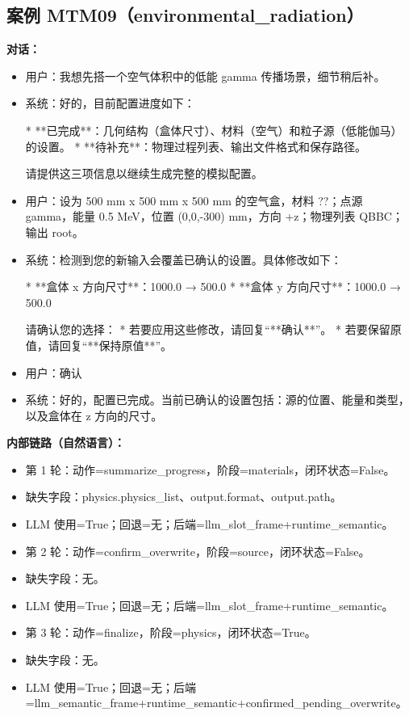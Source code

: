 \documentclass[11pt]{ctexart}
\begin{document}
\subsection{案例 MTM09（environmental\_radiation）}
\textbf{对话：}
\begin{itemize}
\item 用户：我想先搭一个空气体积中的低能 gamma 传播场景，细节稍后补。
\item 系统：好的，目前配置进度如下：

*   **已完成**：几何结构（盒体尺寸）、材料（空气）和粒子源（低能伽马）的设置。
*   **待补充**：物理过程列表、输出文件格式和保存路径。

请提供这三项信息以继续生成完整的模拟配置。
\item 用户：设为 500 mm x 500 mm x 500 mm 的空气盒，材料 ??；点源 gamma，能量 0.5 MeV，位置 (0,0,-300) mm，方向 +z；物理列表 QBBC；输出 root。
\item 系统：检测到您的新输入会覆盖已确认的设置。具体修改如下：

*   **盒体 x 方向尺寸**：1000.0 → 500.0
*   **盒体 y 方向尺寸**：1000.0 → 500.0

请确认您的选择：
*   若要应用这些修改，请回复“**确认**”。
*   若要保留原值，请回复“**保持原值**”。
\item 用户：确认
\item 系统：好的，配置已完成。当前已确认的设置包括：源的位置、能量和类型，以及盒体在 z 方向的尺寸。
\end{itemize}
\textbf{内部链路（自然语言）：}
\begin{itemize}
\item 第 1 轮：动作=summarize\_progress，阶段=materials，闭环状态=False。
\item 缺失字段：physics.physics\_list、output.format、output.path。
\item LLM 使用=True；回退=无；后端=llm\_slot\_frame+runtime\_semantic。
\item 第 2 轮：动作=confirm\_overwrite，阶段=source，闭环状态=False。
\item 缺失字段：无。
\item LLM 使用=True；回退=无；后端=llm\_slot\_frame+runtime\_semantic。
\item 第 3 轮：动作=finalize，阶段=physics，闭环状态=True。
\item 缺失字段：无。
\item LLM 使用=True；回退=无；后端=llm\_semantic\_frame+runtime\_semantic+confirmed\_pending\_overwrite。
\end{itemize}
\end{document}
